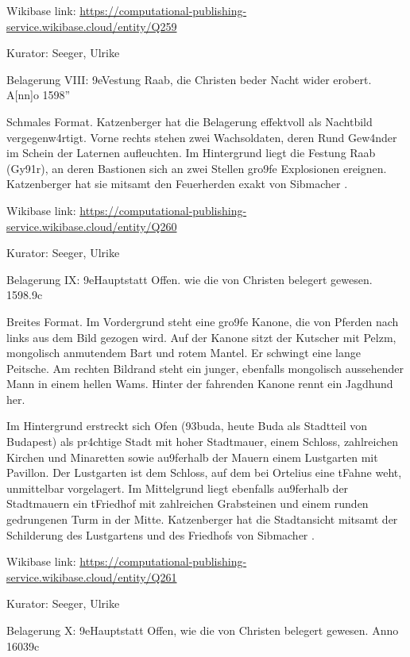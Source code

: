 \documentclass[
  letterpaper,
]{book}
\begin{document}
Wikibase link:
\url{https://computational-publishing-service.wikibase.cloud/entity/Q259}

Kurator: Seeger, Ulrike

Belagerung VIII: \x9eVestung Raab, die Christen be\xbf der
Nacht wider erobert. A{[}nn{]}o 1598''

Schmales Format. Katzenberger hat die Belagerung effektvoll als
Nachtbild vergegenw\xa4rtigt. Vorne rechts stehen zwei Wachsoldaten,
deren R\xbcstungen und Gew\xa4nder im Schein der Laternen
aufleuchten. Im Hintergrund liegt die Festung Raab (Gy\x91r), an
deren Bastionen sich an zwei Stellen gro\x9fe Explosionen ereignen.
Katzenberger hat sie mitsamt den Feuerherden exakt von Sibmacher
\xbcbernommen.

Wikibase link:
\url{https://computational-publishing-service.wikibase.cloud/entity/Q260}

Kurator: Seeger, Ulrike

Belagerung IX: \x9eHauptstatt Offen. wie die von Christen
belegert gewesen. 1598.\x9c

Breites Format. Im Vordergrund steht eine gro\x9fe Kanone, die von
Pferden nach links aus dem Bild gezogen wird. Auf der Kanone sitzt der
Kutscher mit Pelzm\xbctze, mongolisch anmutendem Bart und rotem
Mantel. Er schwingt eine lange Peitsche. Am rechten Bildrand steht ein
junger, ebenfalls mongolisch aussehender Mann in einem hellen Wams.
Hinter der fahrenden Kanone rennt ein Jagdhund her.

Im Hintergrund erstreckt sich Ofen (\x93buda, heute Buda als
Stadtteil von Budapest) als pr\xa4chtige Stadt mit hoher Stadtmauer,
einem Schloss, zahlreichen Kirchen und Minaretten sowie au\x9ferhalb
der Mauern einem Lustgarten mit Pavillon. Der Lustgarten ist dem
Schloss, auf dem bei Ortelius eine t\xbcrkische Fahne weht,
unmittelbar vorgelagert. Im Mittelgrund liegt ebenfalls au\x9ferhalb
der Stadtmauern ein t\xbcrkischer Friedhof mit zahlreichen
Grabsteinen und einem runden gedrungenen Turm in der Mitte. Katzenberger
hat die Stadtansicht mitsamt der Schilderung des Lustgartens und des
Friedhofs von Sibmacher \xbcbernommen.

Wikibase link:
\url{https://computational-publishing-service.wikibase.cloud/entity/Q261}

Kurator: Seeger, Ulrike

Belagerung X: \x9eHauptstatt Offen, wie die von Christen
belegert gewesen. Anno 1603\x9c
\end{document}
